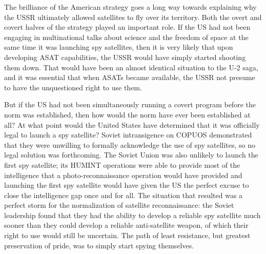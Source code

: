 \documentclass{memoir}
\begin{document}
The brilliance of the American strategy goes a long way towards explaining why the USSR ultimately allowed satellites to fly over its territory. Both the overt and covert halves of the strategy played an important role. If the US had not been engaging in multinational talks about science and the freedom of space at the same time it was launching spy satellites, then it is very likely that upon developing ASAT capabilities, the USSR would have simply started shooting them down. That would have been an almost identical situation to the U-2 saga, and it was essential that when ASATs became available, the USSR not presume to have the unquestioned right to use them.

But if the US had not been simultaneously running a covert program before the norm was established, then how would the norm have ever been established at all? At what point would the United States have determined that it was officially legal to launch a spy satellite? Soviet intransigence on COPUOS demonstrated that they were unwilling to formally acknowledge the use of spy satellites, so no legal solution was forthcoming. The Soviet Union was also unlikely to launch the first spy satellite; its HUMINT operations were able to provide most of the intelligence that a photo-reconnaissance operation would have provided and launching the first spy satellite would have given the US the perfect excuse to close the intelligence gap once and for all. The situation that resulted was a perfect storm for the normalization of satellite reconnaissance: the Soviet leadership found that they had the ability to develop a reliable spy satellite much sooner than they could develop a reliable anti-satellite weapon, of which their right to use would still be uncertain. The path of least resistance, but greatest preservation of pride, was to simply start spying themselves.
\end{document}
